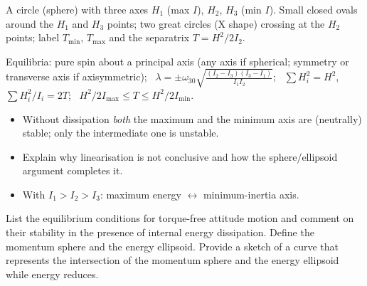 \begin{fig2draw}
A circle (sphere) with three axes $H_1$ (max $I$), $H_2$, $H_3$ (min $I$). Small closed ovals around the $H_1$ and $H_3$ points; two
great circles (X shape) crossing at the $H_2$ points; label $T_{\min}$, $T_{\max}$ and the separatrix $T=H^2/2I_2$.
\end{fig2draw}

\begin{keyf}
Equilibria: pure spin about a principal axis (any axis if spherical; symmetry or transverse axis if axisymmetric); \
$\lambda=\pm\omega_{30}\sqrt{\frac{(I_2-I_3)(I_3-I_1)}{I_1I_2}}$; \ $\sum H_i^2=H^2$, $\sum H_i^2/I_i=2T$; \ $H^2/2I_{\max}\le T\le H^2/2I_{\min}$.
\end{keyf}

\pitfalls
\begin{itemize}
\item Without dissipation \emph{both} the maximum and the minimum axis are (neutrally) stable; only the intermediate one is unstable.
\item Explain why linearisation is not conclusive and how the sphere/ellipsoid argument completes it.
\item With $I_1>I_2>I_3$: maximum energy $\leftrightarrow$ minimum-inertia axis.
\end{itemize}


\begin{qbox}
List the equilibrium conditions for torque-free attitude motion and comment on their stability in the presence of internal energy
dissipation. Define the momentum sphere and the energy ellipsoid. Provide a sketch of a curve that represents the intersection of the
momentum sphere and the energy ellipsoid while energy reduces.
\end{qbox}

